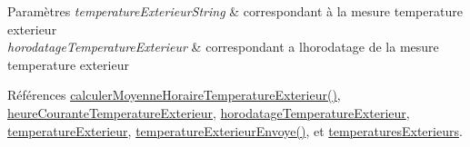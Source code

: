 \begin{DoxyParams}{Paramètres}
{\em temperature\+Exterieur\+String} & correspondant à la mesure temperature exterieur \\
\hline
{\em horodatage\+Temperature\+Exterieur} & correspondant a l\textquotesingle{}horodatage de la mesure temperature exterieur \\
\hline
\end{DoxyParams}


Références \hyperlink{class_infos_temperature_a437325028225d765780b884614c47077}{calculer\+Moyenne\+Horaire\+Temperature\+Exterieur()}, \hyperlink{class_infos_temperature_a44edcf244175896e28798f252900f774}{heure\+Courante\+Temperature\+Exterieur}, \hyperlink{class_infos_temperature_a5c3cd364746dc1cae5f9faee55c7555e}{horodatage\+Temperature\+Exterieur}, \hyperlink{class_infos_temperature_af80286a5b0e05d0379f53c0ebbc7d483}{temperature\+Exterieur}, \hyperlink{class_infos_temperature_a6fbc9ab43714a5ba6649648c15989dee}{temperature\+Exterieur\+Envoye()}, et \hyperlink{class_infos_temperature_a32b2a36e737ab4bf61fc8274990c2943}{temperatures\+Exterieurs}.


